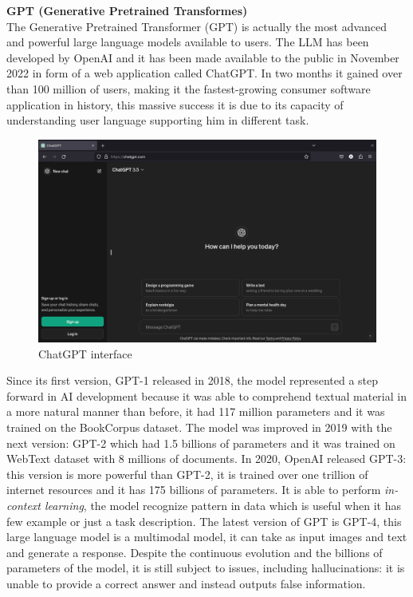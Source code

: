 \textbf{GPT (Generative Pretrained Transformes)}\\
The Generative Pretrained Transformer (GPT) is actually the most advanced and powerful large language models available to users. The LLM has been developed by OpenAI and it has been made available to the public in November 2022 in form of a web application called ChatGPT. In two months it gained over than 100 million of users, making it the  fastest-growing consumer software application in history, this massive success it is due to its capacity of understanding user language supporting him in different task.\cite{chatgpt_wiki} 
\begin{figure}[H]
    \centering
    \includegraphics[width=0.9\linewidth]{Figures/fig_18.png}
    \caption{ChatGPT interface}
    \label{fig:enter-label}
\end{figure}
Since its first version, GPT-1 released in 2018, the model represented a step forward in AI development because it was able to comprehend textual material in a more natural manner than before, it had 117 million parameters and it was trained on the BookCorpus dataset. The model was improved in 2019 with the next version: GPT-2 which had 1.5 billions of parameters and it was trained on WebText dataset with 8 millions of documents.\cite{radford2019language} In 2020, OpenAI released GPT-3: this version is more powerful than GPT-2, it is trained over one trillion of internet resources and it has 175 billions of parameters. It is able to perform \textit{in-context learning}, the model recognize pattern in data which is useful when it has few example or just a task description. \cite{journey_gpt}
The latest version of GPT is GPT-4, this large language model is a multimodal model, it can take as input images and text and generate a response. Despite the continuous evolution and the billions of parameters of the model, it is still subject to issues, including hallucinations: it is unable to provide a correct answer and instead outputs false information.\cite{achiam2023gpt}\\

